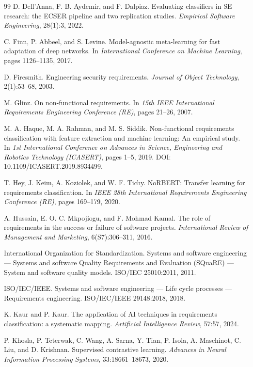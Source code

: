 \documentclass[11pt,a4paper]{article}
\begin{document}
\begin{thebibliography}{99}
 D. Dell'Anna, F. B. Aydemir, and F. Dalpiaz. Evaluating classifiers
in SE research: the ECSER pipeline and two replication studies. \emph{Empirical Software
Engineering}, 28(1):3, 2022.

 C. Finn, P. Abbeel, and S. Levine. Model-agnostic meta-learning for fast
adaptation of deep networks. In \emph{International Conference on Machine Learning}, pages
1126--1135, 2017.

 D. Firesmith. Engineering security requirements. \emph{Journal of
Object Technology}, 2(1):53--68, 2003.

 M. Glinz. On non-functional requirements. In \emph{15th IEEE
International Requirements Engineering Conference (RE)}, pages 21--26, 2007.

 M. A. Haque, M. A. Rahman, and M. S. Siddik. Non-functional
requirements classification with feature extraction and machine learning: An empirical
study. In \emph{1st International Conference on Advances in Science, Engineering and
Robotics Technology (ICASERT)}, pages 1--5, 2019.
  \newblock DOI: 10.1109/ICASERT.2019.8934499.

 T. Hey, J. Keim, A. Koziolek, and W. F. Tichy. NoRBERT: Transfer learning
for requirements classification. In \emph{IEEE 28th International Requirements Engineering
Conference (RE)}, pages 169--179, 2020.

 A. Hussain, E. O. C. Mkpojiogu, and F. Mohmad Kamal. The role of
requirements in the success or failure of software projects. \emph{International Review of
Management and Marketing}, 6(S7):306--311, 2016.

 International Organization for Standardization. Systems and software
engineering --- Systems and software Quality Requirements and Evaluation (SQuaRE) ---
System and software quality models. ISO/IEC 25010:2011, 2011.

 ISO/IEC/IEEE. Systems and software engineering --- Life cycle processes
--- Requirements engineering. ISO/IEC/IEEE 29148:2018, 2018.

 K. Kaur and P. Kaur. The application of AI techniques in requirements
classification: a systematic mapping. \emph{Artificial Intelligence Review}, 57:57, 2024.

 P. Khosla, P. Teterwak, C. Wang, A. Sarna, Y. Tian, P. Isola,
A. Maschinot, C. Liu, and D. Krishnan. Supervised contrastive learning. \emph{Advances in
Neural Information Processing Systems}, 33:18661--18673, 2020.


\end{thebibliography}
\end{document}
